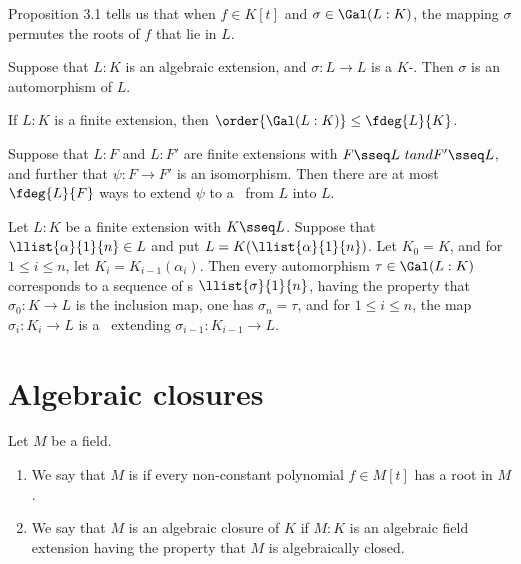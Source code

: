 \documentclass{article}
\begin{document}
  \quad Proposition 3.1 tells us that when $ f\in K[t] $ and $ \sigma\in \Gal(L:K) $, the mapping $ \sigma $ permutes the roots of $ f $ that lie in $ L $.

  \begin{theorem}
    Suppose that $ L:K $ is an algebraic extension, and $ \sigma:L\to L $ is a $ K $-\homo.
    Then $ \sigma $ is an automorphism of $ L $.
  \end{theorem}

  \begin{theorem}
    If $ L:K $ is a finite extension, then $ \order{\Gal(L:K)}\leq \fdeg{L}{K} $.
  \end{theorem}

  \begin{corollary}
    Suppose that $ L:F $ and $ L:F' $ are finite extensions with $ F\sseq L\ tand F'\sseq L $, and further that $ \psi:F\to F' $ is an isomorphism.
    Then there are at most $ \fdeg{L}{F} $ ways to extend $ \psi $ to a \homo~from $ L $ into $ L $.
  \end{corollary}

  \begin{corollary}
    Let $ L:K $ be a finite extension with $ K\sseq L $.
    Suppose that $ \llist{\alpha}{1}{n}\in L $ and put $ L=K(\llist{\alpha}{1}{n}) $.
    Let $ K_0 = K $, and for $ 1\leq i\leq n $, let $ K_i = K_{i-1}(\alpha_i) $.
    Then every automorphism $ \tau \in \Gal(L:K) $ corresponds to a sequence of \homo s $ \llist{\sigma}{1}{n} $, having the property that $ \sigma_0:K\to L $ is the inclusion map, one has $ \sigma_n=\tau $, and for $ 1\leq i\leq n $, the map $ \sigma_i : K_i\to L $ is a \homo~extending $ \sigma_{i-1}:K_{i-1}\to L $.
  \end{corollary}

\section{Algebraic closures}
  \begin{definition}
    Let $ M $ be a field. \begin{enumerate}[label=(\roman*)]
      \item We say that $ M $ is  if every non-constant polynomial $ f\in M[t] $ has a root in $ M $.
      \item We say that $ M $ is an algebraic closure of $ K $ if $ M:K $ is an algebraic field extension having the property that $ M $ is algebraically closed.
    \end{enumerate}
  \end{definition}
\end{document}
